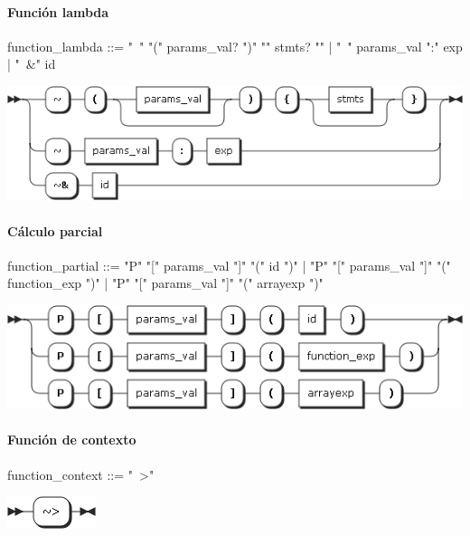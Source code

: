 \paragraph {Función lambda}
\begin{myverbatim}
function_lambda ::= "~" "(" params_val? ")" "{" stmts? "}"
    | "~" params_val ":" exp
    | "~&" id
\end{myverbatim}
\begin{center}
\includegraphics[scale=0.5]{diagram/function_lambda.png} \\
\end{center}
\paragraph {Cálculo parcial}
\begin{myverbatim}
function_partial ::= "P" "[" params_val "]" "(" id ")"
   |  "P" "[" params_val "]" "(" function_exp ")"
   |  "P" "[" params_val "]" "(" arrayexp ")"
\end{myverbatim}
\begin{center}
\includegraphics[scale=0.5]{diagram/function_partial.png} \\
\end{center}
\paragraph {Función de contexto}
\begin{myverbatim}
function_context ::= "~>"
\end{myverbatim}
\begin{center}
\includegraphics[scale=0.5]{diagram/function_context.png} \\
\end{center}


